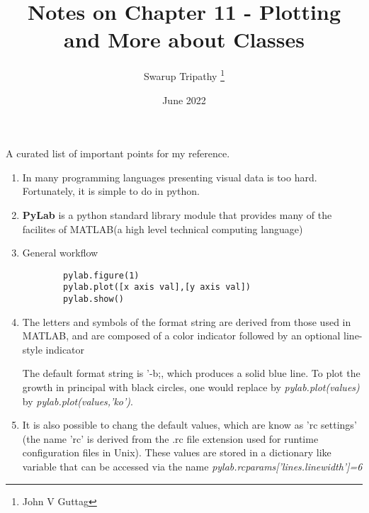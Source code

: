 \documentclass[11pt]{article}
\title{Notes on Chapter 11 - Plotting and More about Classes}
\author{Swarup Tripathy \thanks{John V Guttag}}
\date{June 2022}
\begin{document}
    \maketitle
    A curated list of important points for my reference.\\
    \begin{enumerate}
        \item In many programming languages presenting visual data is too hard. Fortunately, it is simple to do in python.
        \item \textbf{PyLab} is a python standard library module that provides many of the facilites of MATLAB(a high level technical computing language)
        \item General workflow
        \begin{verbatim}
        pylab.figure(1)
        pylab.plot([x axis val],[y axis val])
        pylab.show()
        \end{verbatim}
        \item The letters and symbols of the format string are derived from those used in MATLAB, and are composed of a color indicator followed by an optional line-style indicator
        
        The default format string is '-b;, which produces a solid blue line. To plot the growth in principal with black circles, one would replace by \textit{pylab.plot(values)} by \textit{pylab.plot(values,'ko')}.
        \item It is also possible to chang the default values, which are know as 'rc settings' (the name 'rc' is derived from the .rc file extension used for runtime configuration files in Unix). These values are stored in a dictionary like variable that can be accessed via the name \textit{pylab.rcparams['lines.linewidth']=6}
    \end{enumerate}
\end{document}

